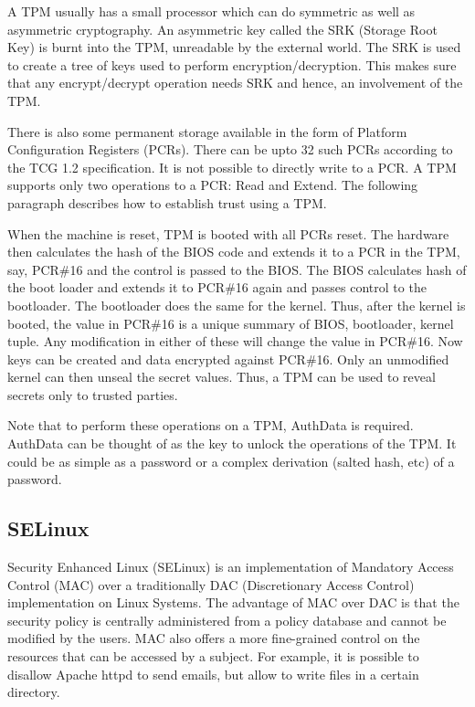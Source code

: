 \documentclass[10pt,twocolumn,pdftex]{article}
\begin{document}
A TPM usually has a small processor which can do symmetric as well as asymmetric cryptography. An asymmetric key called the SRK (Storage Root Key) is burnt into the TPM, unreadable by the external world. The SRK is used to create a tree of keys used to perform encryption/decryption. This makes sure that any encrypt/decrypt operation needs SRK and hence, an involvement of the TPM.

There is also some permanent storage available in the form of Platform Configuration Registers (PCRs). There can be upto 32 such PCRs according to the TCG 1.2 specification. It is not possible to directly write to a PCR. A TPM supports only two operations to a PCR: Read and Extend. The following paragraph describes how to establish trust using a TPM.

When the machine is reset, TPM is booted with all PCRs reset. The hardware then calculates the hash of the BIOS code and extends it to a PCR in the TPM, say, PCR\#16 and the control is passed to the BIOS. The BIOS calculates hash of the boot loader and extends it to PCR\#16 again and passes control to the bootloader. The bootloader does the same for the kernel. Thus, after the kernel is booted, the value in PCR\#16 is a unique summary of {BIOS, bootloader, kernel} tuple. Any modification in either of these will change the value in PCR\#16. Now keys can be created and data encrypted against PCR\#16. Only an unmodified kernel can then unseal the secret values. Thus, a TPM can be used to reveal secrets only to trusted parties. 

Note that to perform these operations on a TPM, AuthData is required. AuthData can be thought of as the key to unlock the operations of the TPM. It could be as simple as a password or a complex derivation (salted hash, etc) of a password. 

\subsection{SELinux}
\label{sec:selinux}
Security Enhanced Linux (SELinux) \cite{SELinux} is an implementation of Mandatory Access Control (MAC) over a traditionally DAC (Discretionary Access Control) implementation on Linux Systems. The advantage of MAC over DAC is that the security policy is centrally administered from a policy database and cannot be modified by the users. MAC also offers a more fine-grained control on the resources that can be accessed by a subject. For example, it is possible to disallow Apache httpd to send emails, but allow to write files in a certain directory.
\end{document}

